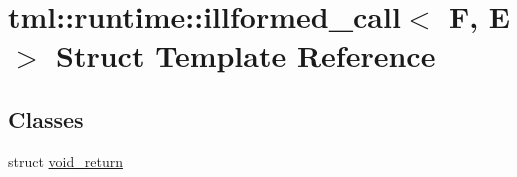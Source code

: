 \hypertarget{structtml_1_1runtime_1_1illformed__call}{\section{tml\+:\+:runtime\+:\+:illformed\+\_\+call$<$ F, E $>$ Struct Template Reference}
\label{structtml_1_1runtime_1_1illformed__call}
}
\subsection*{Classes}
\begin{DoxyCompactItemize}
\item 
struct \hyperlink{structtml_1_1runtime_1_1illformed__call_1_1void__return}{void\+\_\+return}
\end{DoxyCompactItemize}

